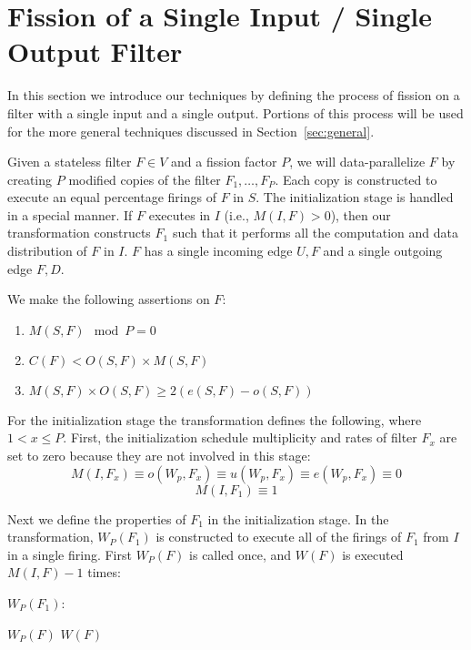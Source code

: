 \section{Fission of a Single Input / Single Output Filter}
\label{sec:single}

In this section we introduce our techniques by defining the
process of fission on a filter with a single input and a single
output. Portions of this process will be used for the more general
techniques discussed in Section~\ref{sec:general}. 

Given a stateless filter $F \in V$ and a fission factor $P$, we will
data-parallelize $F$ by creating $P$ modified copies of the filter
$F_1, \ldots, F_P$.  Each copy is constructed to execute an equal
percentage firings of $F$ in $S$.  The initialization stage is handled
in a special manner.  If $F$ executes in $I$ (i.e., $M(I,F) > 0$),
then our transformation constructs $F_1$ such that it performs all the
computation and data distribution of $F$ in $I$. $F$ has a single
incoming edge ${U,F}$ and a single outgoing edge ${F, D}$.


We make the following assertions on $F$:

\begin{enumerate}

\item $M(S,F) \mod  P = 0$

\item $C(F) < O(S,F) \times M(S,F)$

\item $M(S,F) \times O(S,F) \ge 2(e(S,F) - o(S,F))$

\end{enumerate}


For the initialization stage the transformation defines the following,
where $1 < x \le P$. First, the initialization
schedule multiplicity and rates of filter $F_x$ are set to zero
because they are not involved in this stage:
$$ M(I,F_x) \equiv o(W_p,F_x) \equiv u(W_p,F_x) \equiv e(W_p,F_x)
\equiv 0 $$
$$ M(I,F_1) \equiv 1 $$

Next we define the properties of $F_1$ in the initialization stage. In
the transformation, $W_P(F_1)$ is constructed to execute all of the
firings of $F_1$ from $I$ in a single firing.  First $W_P(F)$ is
called once, and $W(F)$ is executed $M(I,F) - 1$ times:

\begin{algorithm}
$W_P(F_1)$:
\begin{algorithmic}[1]
\State $W_P(F)$
\State $W(F)$
\EndFor
\end{algorithmic}
\end{algorithm}

